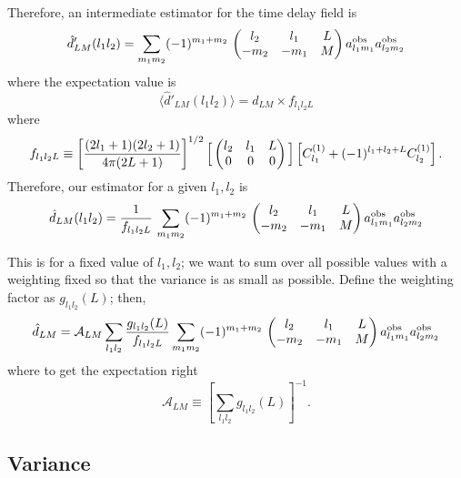 \documentclass[prl,amsmath,amssymb,floatfix,superscriptaddress,nofootinbib,twocolumn]{revtex4-1}
\def\be{\begin{equation}}
\def\ee{\end{equation}}
\begin{document}
Therefore, an intermediate estimator for the time delay field is
\be
\hat d'_{LM}(l_1l_2) =  \sum_{m_1m_2}  (-1)^{m_1+m_2}\,\left(\begin{matrix} l_2 & l_1 &L\cr -m_2&-m_1&M\end{matrix}\right)
 a^{\rm obs}_{l_1m_1} a^{\rm obs}_{l_2m_2} 
 \ee
 where the expectation value is
 \be
\langle \hat d'_{LM}(l_1l_2) \rangle = d_{LM} \times f_{l_1l_2L}
\ee
where
\be
 f_{l_1l_2L}
 \equiv 
 \left[ \frac{(2l_1+1)(2l_2+1)}{4\pi (2L+1)}\right]^{1/2}
 \Big[
 \left(\begin{matrix} l_2& l_1 &L\cr 0&0&0\end{matrix}\right)
  \Big]
  \left[ C^{(1)}_{l_1} + (-1)^{l_1+l_2+L}C^{(1)}_{l_2}\right]
 .\ee
 Therefore, our estimator for a given $l_1,l_2$ is
 \be
 \hat d_{LM}(l_1l_2) =  \frac{1}{f_{l_1l_2L}}\,\sum_{m_1m_2}  (-1)^{m_1+m_2}\,\left(\begin{matrix} l_2 & l_1 &L\cr -m_2&-m_1&M\end{matrix}\right)
 a^{\rm obs}_{l_1m_1} a^{\rm obs}_{l_2m_2} 
 \ee

 
 This is for a fixed value of $l_1, l_2$; we want to sum over all possible values with a weighting fixed so that the variance is as small as possible. Define the weighting factor as $g_{l_1l_2}(L)$; then,
 \be
 \hat d_{LM} = \mathcal{A}_{LM}\sum_{l_1l_2} \frac{g_{l_1l_2}(L)}{f_{l_1l_2L}}\sum_{m_1m_2}  (-1)^{m_1+m_2}\,\left(\begin{matrix} l_2 & l_1 &L\cr -m_2&-m_1&M\end{matrix}\right)
 a^{\rm obs}_{l_1m_1} a^{\rm obs}_{l_2m_2} 
 \ee
 where to get the expectation right
 \be
 \mathcal{A}_{LM} \equiv \left[ \sum_{l_1l_2} g_{l_1l_2}(L) \right]^{-1}
 .\ee
 
 \subsection{Variance}
 
\end{document}
